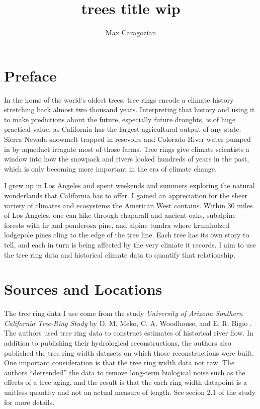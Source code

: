 \documentclass[]{article}
\title{trees title wip}
\author{Max Caragozian}
\begin{document}
	


\maketitle

\section{Preface}

In the home of the world's oldest trees, tree rings encode a climate history stretching back almost two thousand years. Interpreting that history and using it to make predictions about the future, especially future droughts, is of huge practical value, as California has the largest agricultural output of any state. Sierra Nevada snowmelt trapped in resevoirs and Colorado River water pumped in by aqueduct irragate most of those farms. Tree rings give climate scientists a window into how the snowpack and rivers looked hundreds of years in the past, which is only becoming more important in the era of climate change.

I grew up in Los Angeles and spent weekends and summers exploring the natural wonderlands that California has to offer. I gained an appreciation for the sheer variety of climates and ecosystems the American West contains. Within 30 miles of Los Angeles, one can hike through chaparall and ancient  oaks, subalpine forests with fir and ponderosa pine, and alpine tundra where krumholzed lodgepole pines cling to the edge of the tree line. Each tree has its own story to tell, and each in turn is being affected by the very climate it records. I aim to use the tree ring data and historical climate data to quantify that relationship.

\section{Sources and Locations}
The tree ring data I use come from the study \textit{University of Arizona Southern California Tree-Ring Study} by D. M. Meko, C. A. Woodhouse, and E. R. Bigio \cite{tree_study}. The authors used tree ring data to construct estimates of historical river flow. In addition to publishing their hydrological reconstructions, the authors also published the tree ring width datasets on which those reconstructions were built. One important consideration is that the tree ring width data not raw. The authors ``detrended'' the data to remove long-term biological noise such as the effects of a tree aging, and the result is that the each ring width datapoint is a unitless quantity and not an actual measure of length. See secion 2.1 of the study for more details\cite{tree_study}.
\end{document}
